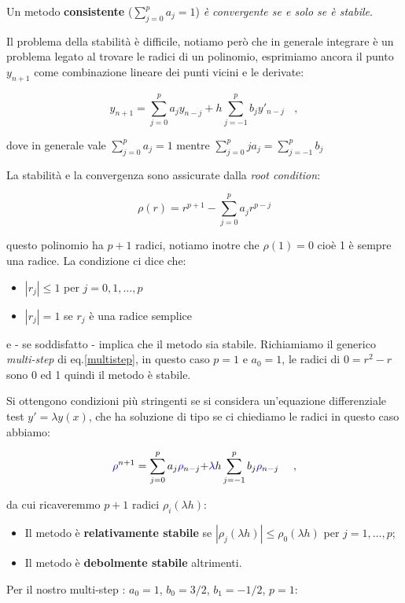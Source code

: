 \documentclass{article}
\begin{document}
	Un metodo \textbf{consistente} ($\sum_{j=0}^p a_j = 1$) \emph{è convergente se e solo se è stabile}.
	
	
	Il problema della stabilità è difficile, notiamo però che in generale integrare è un problema legato al trovare le radici di un polinomio, esprimiamo ancora il punto $y_{n+1}$ come combinazione lineare dei punti vicini e le derivate:
	
	\[ y_{n+1} = \sum^p_{j=0} a_j y_{n-j} + h\sum^p_{j=-1} b_j y'_{n-j}\ \ \ \ , \]
	
	dove in generale vale $\sum^p_{j=0} a_j = 1$ mentre $\sum^p_{j=0} ja_j = \sum^p_{j=-1} b_j$
	
	La stabilità e la convergenza sono assicurate dalla \emph{root condition}:
	
	\[ \rho(r) = r^{p+1} - \sum ^ p_{j=0}a_j r^{p-j} \]
	
	questo polinomio ha $p+1$ radici, notiamo inotre che $\rho(1)=0$ cioè 1 è sempre una radice. La condizione ci dice che:
	\begin{itemize}
		\item $|r_j|\leq 1$ per $j=0,1,\dots, p$
		\item $|r_j|=1$ se $r_j$ è una radice semplice
	\end{itemize}
	e - se soddisfatto - implica che il metodo sia stabile.
	Richiamiamo il generico \emph{multi-step} di eq.\ref{multistep}, in questo caso $p=1$ e $a_0=1$, le radici di $0=r^2-r$ sono 0 ed 1 quindi il metodo è stabile.
	
	Si ottengono condizioni più stringenti se si considera un'equazione differenziale test $y' = \lambda y(x)$, che ha soluzione di tipo se ci chiediamo le radici in questo caso abbiamo:
	
	\[ \color{blue}{\rho}\color{black}{^{n+1} = \sum^p_{j=0} a_j} \color{blue}{\rho}\color{black}{_{n-j} +} \color{blue}{\lambda} \color{black}h\sum^p_{j=-1} b_j \color{blue}{\rho}\color{black}_{n-j}\ \ \ \ ,\]
	
	da cui ricaveremmo $p+1$ radici $\rho_i(\lambda h)$:
	\begin{itemize}
		\item Il metodo è \textbf{relativamente stabile} se $|\rho_j(\lambda h) |\leq \rho_0(\lambda h)$ per $j=1,\dots, p$;
		\item Il metodo è \textbf{debolmente stabile} altrimenti.
	\end{itemize}
	
	Per il nostro multi-step : $a_0=1$, $b_0=3/2$, $b_1=-1/2$, $p=1$:
	
\end{document}
